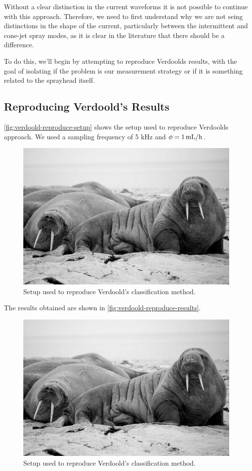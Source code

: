 \documentclass[oneside,12pt]{article}
\begin{document}
Without a clear distinction in the current waveforms it is not possible to continue with this approach.
Therefore, we need to first understand why we are not seing distinctions in the shape 
of the current, particularly between the intermittent and cone-jet spray modes, as it is clear in the 
literature that there should be a difference.

To do this, we'll begin by attempting to reproduce Verdoolds results, with the goal of isolating 
if the problem is our measurement strategy or if it is something related to the sprayhead itself.

\subsection{Reproducing Verdoold's Results}

\autoref{fig:verdoold-reproduce-setup} shows the setup used to reproduce Verdoolds approach.
We used a sampling frequency of 5 kHz and $\phi = 1 \,\mathrm{mL/h}$. 

\begin{figure}[h!]
    \centering
    \includegraphics[width=.8\textwidth,trim=1 1 1 1,clip]{figures/lorem-picsum.jpg}
    \caption{Setup used to reproduce Verdoold's classification method.}
    \label{fig:verdoold-reproduce-setup}
\end{figure}

The results obtained are shown in \autoref{fig:verdoold-reproduce-results}. 

\begin{figure}[h!]
    \centering
    \includegraphics[width=.8\textwidth,trim=1 1 1 1,clip]{figures/lorem-picsum.jpg}
    \caption{Setup used to reproduce Verdoold's classification method.}
    \label{fig:verdoold-reproduce-results}
\end{figure}
\end{document}
